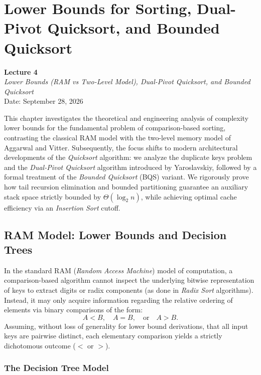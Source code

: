 \chapter{Lower Bounds for Sorting, Dual-Pivot Quicksort, and Bounded Quicksort}
\label{cha:lecture-four}

\begin{center}
  \textbf{Lecture 4}\\
  \emph{Lower Bounds (RAM vs Two-Level Model), Dual-Pivot Quicksort, and Bounded Quicksort}\\[0.5em]
  Date: September 28, 2026
\end{center}

This chapter investigates the theoretical and engineering analysis of complexity lower bounds for the fundamental problem of comparison-based sorting, contrasting the classical RAM model with the two-level memory model of Aggarwal and Vitter. Subsequently, the focus shifts to modern architectural developments of the \textit{Quicksort} algorithm: we analyze the duplicate keys problem and the \textit{Dual-Pivot Quicksort} algorithm introduced by Yaroslavskiy, followed by a formal treatment of the \textit{Bounded Quicksort} (BQS) variant. We rigorously prove how tail recursion elimination and bounded partitioning guarantee an auxiliary stack space strictly bounded by $\Theta(\log_2 n)$, while achieving optimal cache efficiency via an \textit{Insertion Sort} cutoff.

\FloatBarrier
\section{RAM Model: Lower Bounds and Decision Trees}
\label{sec:ram-lower-bounds}

In the standard RAM (\textit{Random Access Machine}) model of computation, a comparison-based algorithm cannot inspect the underlying bitwise representation of keys to extract digits or radix components (as done in \textit{Radix Sort} algorithms). Instead, it may only acquire information regarding the relative ordering of elements via binary comparisons of the form:
\begin{equation}
  A < B, \quad A = B, \quad \text{or} \quad A > B.
\end{equation}
Assuming, without loss of generality for lower bound derivations, that all input keys are pairwise distinct, each elementary comparison yields a strictly dichotomous outcome ($<$ or $>$).

\subsection{The Decision Tree Model}
\label{subsec:decision-tree-model}

